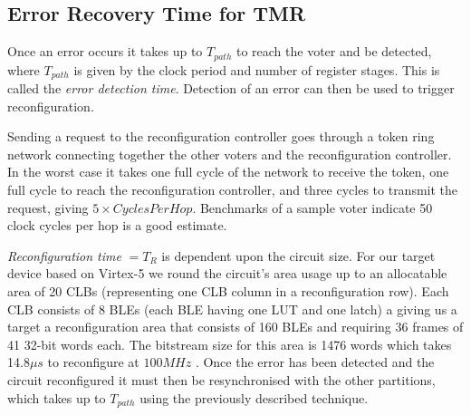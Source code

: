 \documentclass[12pt,final,oneside]{dwThesis} %
\begin{document}
   \subsection{Error Recovery Time for \gls{TMR}}

   Once an error occurs it takes up to $T_{path}$ to reach the voter and be
   detected, where $T_{path}$ is given by the clock period and number of
   register stages. This is called the \textit{error detection time}. Detection
   of an error can then be used to trigger reconfiguration.
   
   Sending a request to the reconfiguration controller goes through a token
   ring network connecting together the other voters and the reconfiguration
   controller. In the worst case it takes one full cycle of the network to
   receive the token, one full cycle to reach the reconfiguration controller,
   and three cycles to transmit the request, giving $5\times Cycles Per Hop$.
   Benchmarks of a sample voter indicate 50 clock cycles per hop is a good
   estimate.

   \textit{Reconfiguration time} $= T_R$ is dependent upon the circuit size.
   For our target device based on Virtex-5 we round the circuit's area usage up
   to an allocatable area of 20 \glspl{CLB} (representing one \gls{CLB} column
   in a reconfiguration row). Each \gls{CLB} consists of 8 \glspl{BLE} (each
   \gls{BLE} having one \gls{LUT} and one latch) a giving us a target a
   reconfiguration area that consists of 160 \glspl{BLE} and requiring 36
   frames of 41 32-bit words each. The bitstream size for this area is 1476
   words which takes 14.8$\mu{}s$ to reconfigure at $100MHz$
   \cite{XilinxConfigurationUG}.  Once the error has been detected and the
   circuit reconfigured it must then be resynchronised with the other
   partitions, which takes up to $T_{path}$ using the previously described
   technique.
\end{document}
